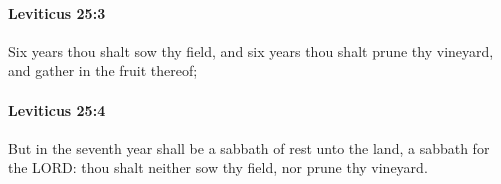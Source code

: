 		\paragraph{Leviticus 25:3} %
			\label{LEVITICUS-25-3}

			Six years thou shalt sow thy field, and six years thou shalt prune thy vineyard, and gather in the fruit thereof;


		\paragraph{Leviticus 25:4} %
			\label{LEVITICUS-25-4}

			But in the seventh year shall be a sabbath of rest unto the land, a sabbath for the LORD: thou shalt neither sow thy field, nor prune thy vineyard.


